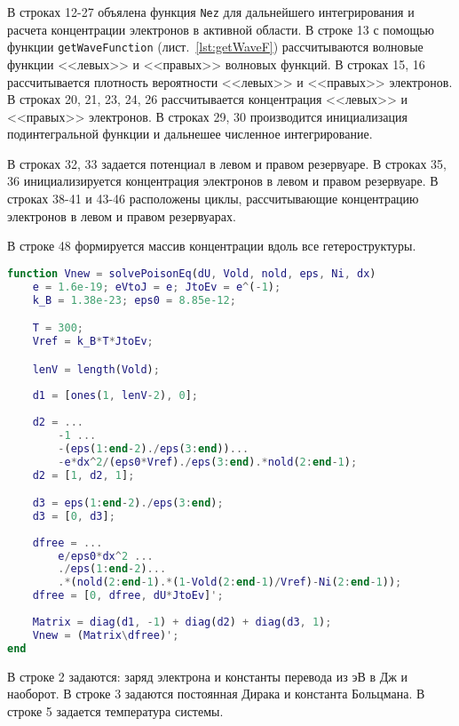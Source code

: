 В строках 12-27 объялена функция \texttt{Nez} для дальнейшего интегрирования и расчета концентрации электронов в активной области. В строке 13 с помощью функции \texttt{getWaveFunction} (лист.~\ref{lst:getWaveF}) рассчитываются волновые функции <<левых>> и <<правых>> волновых функций. В строках 15, 16 рассчитывается плотность вероятности <<левых>> и <<правых>> электронов. В строках 20, 21, 23, 24, 26 рассчитывается концентрация <<левых>> и <<правых>> электронов. В строках 29, 30 производится инициализация подинтегральной функции и дальнешее численное интегрирование.

В строках 32, 33 задается потенциал в левом и правом резервуаре. В строках 35, 36 инициализируется концентрация электронов в левом и правом резервуаре. В строках 38-41 и 43-46 расположены циклы, рассчитывающие концентрацию электронов в левом и правом резервуарах.

В строке 48 формируется массив концентрации вдоль все гетероструктуры.
\begin{lstlisting}[style=realcode,language=Matlab,caption={Решение уравнения Пуассона},label={lst:pois}]
function Vnew = solvePoisonEq(dU, Vold, nold, eps, Ni, dx)
	e = 1.6e-19; eVtoJ = e; JtoEv = e^(-1); 	
	k_B = 1.38e-23; eps0 = 8.85e-12;

	T = 300;
	Vref = k_B*T*JtoEv;

	lenV = length(Vold);
	
	d1 = [ones(1, lenV-2), 0];
	
	d2 = ...
		-1 ...
		-(eps(1:end-2)./eps(3:end))...
		-e*dx^2/(eps0*Vref)./eps(3:end).*nold(2:end-1);
	d2 = [1, d2, 1];

	d3 = eps(1:end-2)./eps(3:end);
	d3 = [0, d3];
	
	dfree = ...
		e/eps0*dx^2 ...
		./eps(1:end-2)...
		.*(nold(2:end-1).*(1-Vold(2:end-1)/Vref)-Ni(2:end-1));
	dfree = [0, dfree, dU*JtoEv]';
	
	Matrix = diag(d1, -1) + diag(d2) + diag(d3, 1);
	Vnew = (Matrix\dfree)';
end
\end{lstlisting}
В строке 2 задаются: заряд электрона и константы перевода из эВ в Дж и наоборот. В строке 3 задаются постоянная Дирака и константа Больцмана. В строке 5 задается температура системы.
